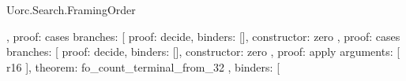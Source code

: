 \begin{lexlean}{Uorc.Search.FramingOrder}
\begin{semanticmodule}
{{{{{{{{{{{{{{{{{{{{{{{{{{{{{                                                                                    },
                                                                                    {
                                                                                      proof: cases{
                                                                                        branches: [
                                                                                          {
                                                                                            proof: decide{},
                                                                                            binders: [],
                                                                                            constructor: zero
                                                                                          },
                                                                                          {
                                                                                            proof: cases{
                                                                                              branches: [
                                                                                                {
                                                                                                  proof: decide{},
                                                                                                  binders: [],
                                                                                                  constructor: zero
                                                                                                },
                                                                                                {
                                                                                                  proof: apply{
                                                                                                    arguments: [
                                                                                                      r16
                                                                                                    ],
                                                                                                    theorem: fo_count_terminal_from_32
                                                                                                  },
                                                                                                  binders: [
}}}}}}}}}}}}}}}}}}}}}}}}}}}}}}}}}
\end{semanticmodule}
\end{lexlean}
